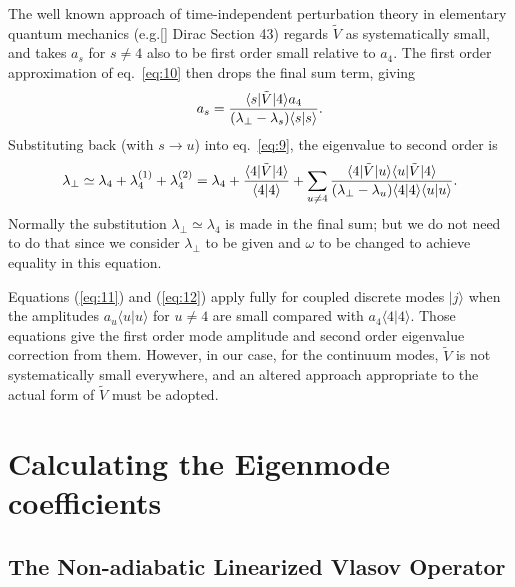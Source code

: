 \documentclass[12pt]{article}
\def\ket#1{|#1\rangle}
\def\bra#1{\langle#1}
\begin{document}
The well known approach of time-independent perturbation theory in
elementary quantum mechanics (e.g.[] Dirac Section 43) regards $\tilde{V}$ as
systematically small, and takes $a_s$ for $s\not=4$ also to be first
order small relative to $a_4$. The first order approximation of eq.\
\ref{eq:10} then drops the final sum term, giving
\begin{equation}
  \label{eq:11}
  a_s = {\bra{s}|\tilde{V}\ket{4}a_4\over (\lambda_\perp-\lambda_s)\bra{s}\ket{s}}.
\end{equation}
Substituting back (with $s\to u$) into eq.\ \ref{eq:9}, the
eigenvalue to second order is
\begin{equation}
  \label{eq:12}
 \lambda_\perp\simeq \lambda_4+\lambda_{4}^{(1)}+\lambda_{4}^{(2)}=\lambda_4
  +{\bra{4}|\tilde{V}\ket{4}\over \bra{4}\ket{4}}
    +\sum_{u\not=4}
    {\bra{4}|\tilde{V}\ket{u}\bra{u}|\tilde{V}\ket{4}\over
      (\lambda_\perp-\lambda_u)\bra{4}\ket{4}\bra{u}\ket{u}}.
\end{equation}
Normally the substitution $\lambda_\perp\simeq\lambda_4$ is made in
the final sum; but we do not need to do that since we consider
$\lambda_\perp$ to be given and $\omega$ to be changed to achieve
equality in this equation.

Equations (\ref{eq:11}) and (\ref{eq:12}) apply fully for coupled
discrete modes $\ket{j}$ when the amplitudes $a_u\bra{u}\ket{u}$
for $u\not=4$ are small compared with $a_4\bra{4}\ket{4}$. Those
equations give the first order mode amplitude and second order
eigenvalue correction from them.  However, in our case, for the
continuum modes, $\tilde{V}$ is not systematically small everywhere,
and an altered approach appropriate to the actual form of $\tilde{V}$
must be adopted.


\section{Calculating the Eigenmode coefficients}
\subsection{The Non-adiabatic Linearized Vlasov Operator}
\end{document}
